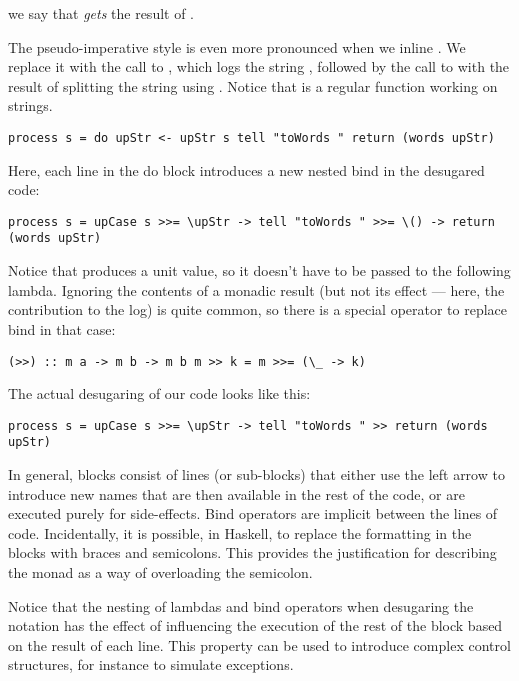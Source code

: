 we say that  \emph{gets} the result of .

The pseudo-imperative style is even more pronounced when we inline
. We replace it with the call to , which
logs the string , followed by the call to
 with the result of splitting the string 
using . Notice that  is a regular function
working on strings.

\begin{verbatim}
process s = do upStr <- upStr s tell "toWords " return (words upStr)
\end{verbatim}

Here, each line in the do block introduces a new nested bind in the
desugared code:

\begin{verbatim}
process s = upCase s >>= \upStr -> tell "toWords " >>= \() -> return (words upStr)
\end{verbatim}

Notice that  produces a unit value, so it doesn't have to
be passed to the following lambda. Ignoring the contents of a monadic
result (but not its effect --- here, the contribution to the log) is
quite common, so there is a special operator to replace bind in that
case:

\begin{verbatim}
(>>) :: m a -> m b -> m b m >> k = m >>= (\_ -> k)
\end{verbatim}

The actual desugaring of our code looks like this:

\begin{verbatim}
process s = upCase s >>= \upStr -> tell "toWords " >> return (words upStr)
\end{verbatim}

In general,  blocks consist of lines (or sub-blocks) that
either use the left arrow to introduce new names that are then available
in the rest of the code, or are executed purely for side-effects. Bind
operators are implicit between the lines of code. Incidentally, it is
possible, in Haskell, to replace the formatting in the 
blocks with braces and semicolons. This provides the justification for
describing the monad as a way of overloading the semicolon.

Notice that the nesting of lambdas and bind operators when desugaring
the  notation has the effect of influencing the execution of
the rest of the  block based on the result of each line. This
property can be used to introduce complex control structures, for
instance to simulate exceptions.

